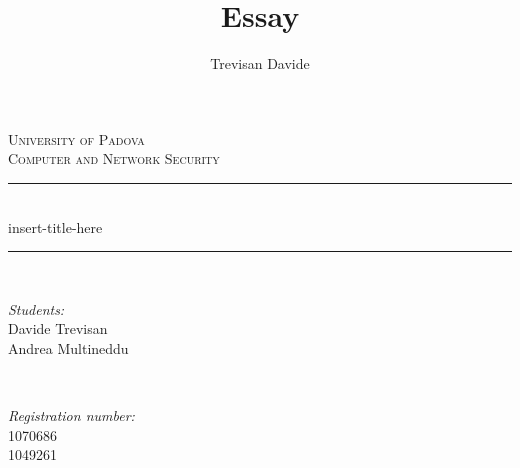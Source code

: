 \documentclass[12pt]{article}
\title{Essay}
\date{}
\author{Trevisan Davide}
\begin{document}
		
		
		
		\begin{titlepage}
			
			\newcommand{\HRule}{\rule{\linewidth}{0.5mm}} %
			
			\center %
			
			
			\textsc{\LARGE University of Padova}\\[1.5cm] %
			\textsc{\Large Computer and Network Security}\\[0.5cm] %
			
			
			\HRule \\[0.4cm]
			{ \huge insert-title-here}\\[0.3cm]
			\HRule \\[1.5cm]
			
			
			\begin{minipage}{0.4\textwidth}
				\begin{flushleft} \large
					\emph{Students:}\\
					Davide Trevisan\\ %
					Andrea Multineddu\\
				\end{flushleft}
			\end{minipage}
			~
			\begin{minipage}{0.4\textwidth}
				\begin{flushright}\large
					\emph{Registration number:} \\
					\textsc{1070686}\\ %
					\textsc{1049261}\\
				\end{flushright}
			\end{minipage}\\[1cm]
			

\end{titlepage}
\end{document}

